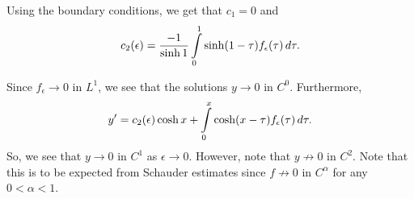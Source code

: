 \begin{example}
Using the boundary conditions, we get that $c_1 = 0$ and
\begin{equation}
c_2 (\epsilon) = \frac{-1}{\sinh 1} \int\limits_0^1 \sinh(1-\tau)f_\epsilon(\tau)\, d\tau.
\end{equation}

Since $f_\epsilon \to 0$ in $L^1$, we see that the solutions $y\to 0$ in $C^0$. Furthermore,
\begin{equation}
y' = c_2(\epsilon)\cosh x  + \int\limits_0^x \cosh(x-\tau)f_\epsilon(\tau) \, d\tau.
\end{equation}
So, we see that $y \to 0$ in $C^1$ as $\epsilon \to 0$. However, note that $y \not \to 0$ in $C^2$. Note that this is to be expected from Schauder estimates since $f\not \to 0$ in $C^\alpha$ for any $0<\alpha<1$.

\end{example}


